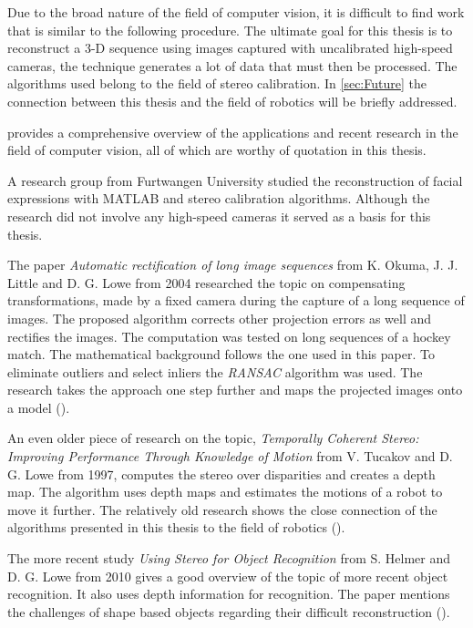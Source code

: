 \label{c:relatedWorks}
Due to the broad nature of the field of computer vision, it is difficult to find work that is similar to the following procedure. The ultimate goal for this thesis is to reconstruct a 3-D sequence using images captured with uncalibrated high-speed cameras, the technique generates a lot of data that must then be processed. The algorithms used belong to the field of stereo calibration.
In \autoref{sec:Future} the connection between this thesis and the field of robotics will be briefly addressed.

\cite{Lowe.2016} provides a comprehensive overview of the applications and recent research in the field of computer vision, all of which are worthy of quotation in this thesis.

A research group from Furtwangen University studied the reconstruction of facial expressions with MATLAB and stereo calibration algorithms. Although the research did not involve any high-speed cameras it served as a basis for this thesis.

The paper \textit{Automatic rectification of long image sequences} from K. Okuma, J. J. Little and D. G. Lowe from 2004 researched the topic on compensating transformations, made by a fixed camera during the capture of a long sequence of images. The proposed algorithm corrects other projection errors as well and rectifies the images. The computation was tested on long sequences of a hockey match. The mathematical background follows the one used in this paper. To eliminate outliers and select inliers the \textit{RANSAC} algorithm was used. The research takes the approach one step further and maps the projected images onto a model (\cite{Okuma.2004}).

An even older piece of research on the topic, \textit{Temporally Coherent Stereo: Improving Performance Through Knowledge of Motion} from V. Tucakov and D. G. Lowe from 1997, computes the stereo over disparities and creates a depth map. The algorithm uses depth maps and estimates the motions of a robot to move it further. The relatively old research shows the close connection of the algorithms presented in this thesis to the field of robotics (\cite{Tucakov.1997}). 

The more recent study \textit{Using Stereo for Object Recognition} from S. Helmer and D. G. Lowe from 2010 gives a good overview of the topic of more recent object recognition. It also uses depth information for recognition. The paper mentions the challenges of shape based objects regarding their difficult reconstruction (\cite{Helmer.2010}).


